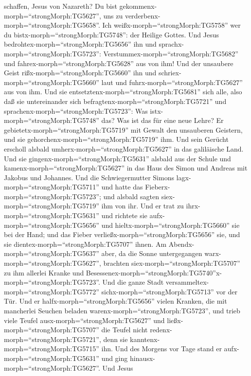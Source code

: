 schaffen, Jesus von Nazareth? Du bist
gekommenx-morph=``strongMorph:TG5627'', uns zu
verderbenx-morph=``strongMorph:TG5658''. Ich
weißx-morph=``strongMorph:TG5758'' wer du
bistx-morph=``strongMorph:TG5748'': der Heilige Gottes. 
Und Jesus bedrohtex-morph=``strongMorph:TG5656'' ihn und
sprachx-morph=``strongMorph:TG5723'':
Verstummex-morph=``strongMorph:TG5682'' und
fahrex-morph=``strongMorph:TG5628'' aus von ihm!  Und der
unsaubere Geist rißx-morph=``strongMorph:TG5660'' ihn und
schriex-morph=``strongMorph:TG5660'' laut und
fuhrx-morph=``strongMorph:TG5627'' aus von ihm.  Und sie
entsetztenx-morph=``strongMorph:TG5681'' sich alle, also daß sie
untereinander sich befragtenx-morph=``strongMorph:TG5721'' und
sprachenx-morph=``strongMorph:TG5723'': Was
istx-morph=``strongMorph:TG5748'' das? Was ist das für eine neue Lehre?
Er gebietetx-morph=``strongMorph:TG5719'' mit Gewalt den unsauberen
Geistern, und sie gehorchenx-morph=``strongMorph:TG5719'' ihm.
 Und sein Gerücht erscholl alsbald
umherx-morph=``strongMorph:TG5627'' in das galiläische Land.
 Und sie gingenx-morph=``strongMorph:TG5631'' alsbald aus
der Schule und kamenx-morph=``strongMorph:TG5627'' in das Haus des Simon
und Andreas mit Jakobus und Johannes.  Und die
Schwiegermutter Simons lagx-morph=``strongMorph:TG5711'' und hatte das
Fieberx-morph=``strongMorph:TG5723''; und alsbald sagten
siex-morph=``strongMorph:TG5719'' ihm von ihr.  Und er trat
zu ihrx-morph=``strongMorph:TG5631'' und richtete sie
aufx-morph=``strongMorph:TG5656'' und
hieltx-morph=``strongMorph:TG5660'' sie bei der Hand; und das Fieber
verließx-morph=``strongMorph:TG5656'' sie, und sie
dientex-morph=``strongMorph:TG5707'' ihnen.  Am
Abendx-morph=``strongMorph:TG5637'' aber, da die Sonne untergegangen
warx-morph=``strongMorph:TG5627'', brachten
siex-morph=``strongMorph:TG5707'' zu ihm allerlei Kranke und
Besessenex-morph=``strongMorph:TG5740''x-morph=``strongMorph:TG5723''.
 Und die ganze Stadt
versammeltex-morph=``strongMorph:TG5772''
sichx-morph=``strongMorph:TG5713'' vor der Tür.  Und er
halfx-morph=``strongMorph:TG5656'' vielen Kranken, die mit mancherlei
Seuchen beladen warenx-morph=``strongMorph:TG5723'', und trieb viele
Teufel ausx-morph=``strongMorph:TG5627'' und
ließx-morph=``strongMorph:TG5707'' die Teufel nicht
redenx-morph=``strongMorph:TG5721'', denn sie
kanntenx-morph=``strongMorph:TG5715'' ihn.  Und des Morgens
vor Tage stand er aufx-morph=``strongMorph:TG5631'' und ging
hinausx-morph=``strongMorph:TG5627''. Und Jesus
